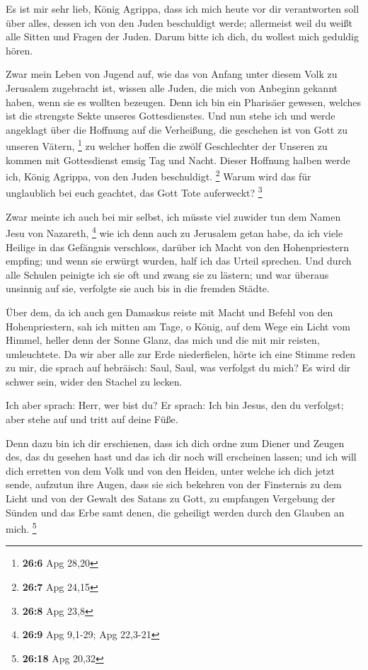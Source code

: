  Es ist mir sehr lieb, König Agrippa, dass ich mich heute
vor dir verantworten soll über alles, dessen ich von den Juden
beschuldigt werde;  allermeist weil du weißt alle Sitten
und Fragen der Juden. Darum bitte ich dich, du wollest mich geduldig
hören.

 Zwar mein Leben von Jugend auf, wie das von Anfang unter
diesem Volk zu Jerusalem zugebracht ist, wissen alle Juden,
 die mich von Anbeginn gekannt haben, wenn sie es wollten
bezeugen. Denn ich bin ein Pharisäer gewesen, welches ist die strengste
Sekte unseres Gottesdienstes.  Und nun stehe ich und werde
angeklagt über die Hoffnung auf die Verheißung, die geschehen ist von
Gott zu unseren Vätern, \footnote{\textbf{26:6} Apg 28,20}
 zu welcher hoffen die zwölf Geschlechter der Unseren zu
kommen mit Gottesdienst emsig Tag und Nacht. Dieser Hoffnung halben
werde ich, König Agrippa, von den Juden beschuldigt. \footnote{\textbf{26:7}
  Apg 24,15}  Warum wird das für unglaublich bei euch
geachtet, das Gott Tote auferweckt? \footnote{\textbf{26:8} Apg 23,8}

 Zwar meinte ich auch bei mir selbst, ich müsste viel
zuwider tun dem Namen Jesu von Nazareth, \footnote{\textbf{26:9} Apg
  9,1-29; Apg 22,3-21}  wie ich denn auch zu Jerusalem
getan habe, da ich viele Heilige in das Gefängnis verschloss, darüber
ich Macht von den Hohenpriestern empfing; und wenn sie erwürgt wurden,
half ich das Urteil sprechen.  Und durch alle Schulen
peinigte ich sie oft und zwang sie zu lästern; und war überaus unsinnig
auf sie, verfolgte sie auch bis in die fremden Städte.

 Über dem, da ich auch gen Damaskus reiste mit Macht und
Befehl von den Hohenpriestern,  sah ich mitten am Tage, o
König, auf dem Wege ein Licht vom Himmel, heller denn der Sonne Glanz,
das mich und die mit mir reisten, umleuchtete.  Da wir
aber alle zur Erde niederfielen, hörte ich eine Stimme reden zu mir, die
sprach auf hebräisch: Saul, Saul, was verfolgst du mich? Es wird dir
schwer sein, wider den Stachel zu lecken.

 Ich aber sprach: Herr, wer bist du? Er sprach: Ich bin
Jesus, den du verfolgst; aber stehe auf und tritt auf deine Füße.

 Denn dazu bin ich dir erschienen, dass ich dich ordne
zum Diener und Zeugen des, das du gesehen hast und das ich dir noch will
erscheinen lassen;  und ich will dich erretten von dem
Volk und von den Heiden, unter welche ich dich jetzt sende,
 aufzutun ihre Augen, dass sie sich bekehren von der
Finsternis zu dem Licht und von der Gewalt des Satans zu Gott, zu
empfangen Vergebung der Sünden und das Erbe samt denen, die geheiligt
werden durch den Glauben an mich. \footnote{\textbf{26:18} Apg 20,32}


